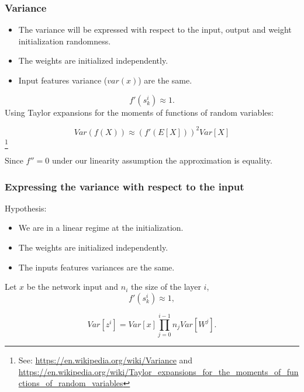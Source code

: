 \begin{frame}
  \frametitle{Variance}
  \begin{itemize}
    \item The variance will be expressed with respect to the input, output and weight initialization randomness. 
    \item The weights are initialized independently. 
    \item Input features variance ($var(x)$) are the same. 
  \end{itemize}

  \begin{equation}
    f'(s^i_k) \approx 1. 
  \end{equation}
  Using  Taylor expansions for the moments of functions of random variables: 

  \begin{equation} \label{eq:variance_of_a_function}
    Var(f(X)) 
    \approx 
    \left(
      f'\left( E[X]\right)
    \right)^2
    Var[X]
  \end{equation}\footnote{See: \url{https://en.wikipedia.org/wiki/Variance} and \url{https://en.wikipedia.org/wiki/Taylor_expansions_for_the_moments_of_functions_of_random_variables}}
  
  Since $f'' = 0$ under our linearity assumption the approximation is equality. 
\end{frame}

\begin{frame}
  \frametitle{Expressing the variance with respect to the input}

  Hypothesis: 

  \begin{itemize}
    \item We are in a linear regime at the initialization. 
    \item The weights are initialized independently.
    \item The inputs features variances are the same. 
  \end{itemize}

  Let $x$ be the network input and $n_i$ the size of the layer $i$, 
  \begin{equation}
    f'(s^i_k) \approx 1,
  \end{equation}

  \begin{equation} \label{eq:variance_output}
    Var \left[ z^i \right] 
    =
     Var[x] 
     \prod_{j = 0}^{i - 1} n_j Var\left[ W^j \right] .
  \end{equation}
\end{frame}


